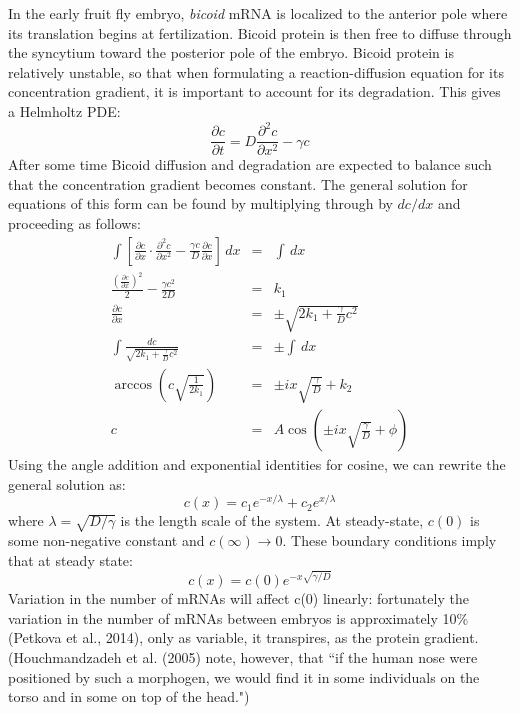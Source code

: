 \documentclass{article}
\begin{document}
In the early fruit fly embryo, \textit{bicoid} mRNA is localized to the anterior pole where its translation begins at fertilization. Bicoid protein is then free to diffuse through the syncytium toward the posterior pole of the embryo. Bicoid protein is relatively unstable, so that when formulating a reaction-diffusion equation for its concentration gradient, it is important to account for its degradation. This gives a Helmholtz PDE:
\[ \frac{\partial c}{\partial t} = D \frac{\partial^2 c}{\partial x^2} - \gamma c \]
After some time Bicoid diffusion and degradation are expected to balance such that the concentration gradient becomes constant. The general solution for equations of this form can be found by multiplying through by $dc/dx$ and proceeding as follows:
\begin{eqnarray*}
\int \left[ \frac{\partial c}{\partial x} \cdot \frac{\partial^2 c}{\partial x^2} - \frac{\gamma c}{D} \frac{\partial c}{\partial x} \right]\, dx & = & \int \, dx \\
\frac{\left( \frac{\partial c}{\partial x} \right)^2}{2} - \frac{\gamma c^2}{2D}   & = & k_1\\
 \frac{\partial c}{\partial x} & = & \pm \sqrt{2k_1 + \frac{\gamma}{D} c^2}\\
 \int \frac{dc}{\sqrt{2k_1 + \frac{\gamma}{D} c^2}} & = & \pm \int \, dx\\
 \arccos \left( c \sqrt{\frac{1}{2k_1}} \right) & = & \pm ix\sqrt{\frac{\gamma}{D}} + k_2 \\
 c & = & A \cos \left( \pm i x \sqrt{\frac{\gamma}{D}} + \phi \right)
\end{eqnarray*}
Using the angle addition and exponential identities for cosine, we can rewrite the general solution as:
\[ c(x) = c_1 e^{-x/ \lambda} + c_2 e^{x/\lambda} \]
where $\lambda = \sqrt{D/\gamma}$ is the length scale of the system. At steady-state, $c(0)$ is some non-negative constant and $c(\infty) \to 0$. These boundary conditions imply that at steady state:
\[  c(x) = c(0) e^{-x\sqrt{\gamma/D}} \]
Variation in the number of mRNAs will affect c(0) linearly: fortunately the variation in the number of mRNAs between embryos is approximately 10\% (Petkova et al., 2014), only as variable, it transpires, as the protein gradient. (Houchmandzadeh et al. (2005) note, however, that ``if the human nose were positioned by such a
morphogen, we would find it in some individuals on the
torso and in some on top of the head.") \\
\end{document}
